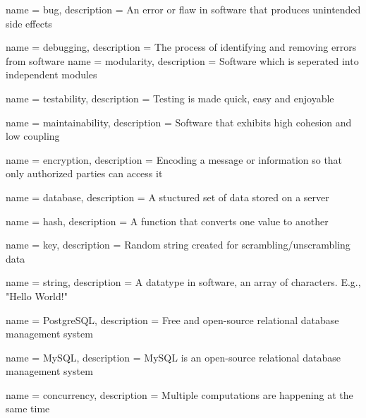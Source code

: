 














{
	name = bug,
	description = { An error or flaw in software that produces unintended side effects }
}

{
	name = debugging,
	description = { The process of identifying and removing errors from software }
}
{
	name = modularity,
	description = {Software which is seperated into independent modules}
}

{
	name = testability,
	description = { Testing is made quick, easy and enjoyable }
}

{
	name = maintainability,
	description = { Software that exhibits high cohesion and low coupling }
}

{
	name = encryption, 
	description = { Encoding a message or information so that only authorized parties can access it}
}

{
	name = database,
	description =  { A stuctured set of data stored on a server } 
}

{
	name = hash, 
	description = { A function that converts one value to another }
}

{
	name = key, 
	description = { Random string created for scrambling/unscrambling data }
}

{
	name = string, 
	description = { A datatype in software, an array of characters. E.g., "Hello World!"}
}

{
	name = PostgreSQL,
	description =  { Free and open-source relational database management system }
}

{
	name = MySQL,
	description = { MySQL is an open-source relational database management system }
}

{
	name = concurrency,
	description = { Multiple computations are happening at the same time }
}
